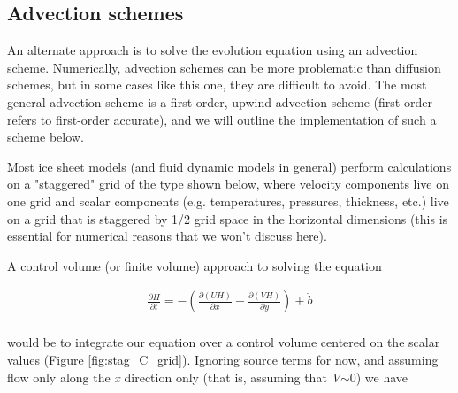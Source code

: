 \subsection{Advection schemes}
An alternate approach is to solve the evolution equation using an advection scheme. Numerically, advection schemes can be more problematic than diffusion schemes, but in some cases like this one, they are difficult to avoid. The most general advection scheme is a first-order, upwind-advection scheme (first-order refers to first-order accurate), and we will outline the implementation of such a scheme below.

Most ice sheet models (and fluid dynamic models in general) perform calculations on a "staggered" grid of the type shown below, where velocity components live on one grid and scalar components (e.g. temperatures, pressures, thickness, etc.) live on a grid that is staggered by 1/2 grid space in the horizontal dimensions (this is essential for numerical reasons that we won't discuss here).


A control volume (or finite volume) approach to solving the equation 

\begin{align*}
\frac{\partial H}{\partial t}=-\left( \frac{\partial \left( UH \right)}{\partial x}+\frac{\partial \left( VH \right)}{\partial y} \right)+\dot{b} \\ 
\end{align*}

would be to integrate our equation over a control volume centered on the scalar values (Figure \ref{fig:stag_C_grid}). Ignoring source terms for now, and assuming flow only along the \textit{x} direction only (that is, assuming that \textit{V}\(\sim\)0) we have

